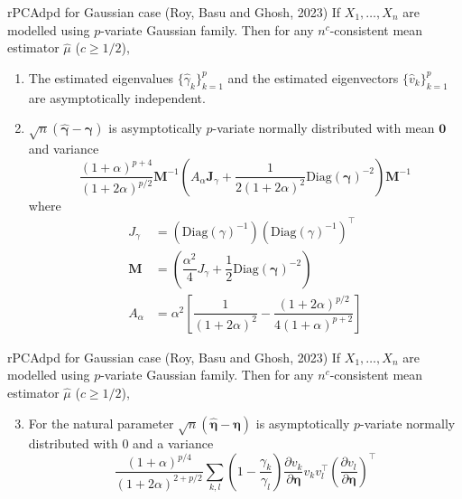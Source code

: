 \documentclass[10pt]{beamer}
\newcommand{\bb}[1]{\boldsymbol{#1}}
\newcommand{\tr}{^{\intercal}}
\begin{document}
\begin{frame}{rPCAdpd for Gaussian case (Roy, Basu and Ghosh, 2023)}
    If $X_1, \dots, X_n$ are modelled using $p$-variate Gaussian family. Then for any $n^c$-consistent mean estimator $\widehat{\mu}$ ($c \geq 1/2$),
    \begin{enumerate}
        \item The estimated eigenvalues $\{ \widehat{\gamma}_k \}_{k=1}^p$ and the estimated eigenvectors $\{ \widehat{v}_k \}_{k=1}^p$ are asymptotically independent.
        \item $\sqrt{n}(\widehat{\bb{\gamma}} - \bb{\gamma})$ is asymptotically $p$-variate normally distributed with mean $\bb{0}$ and variance 
        \begin{equation*}
            \dfrac{(1+\alpha)^{p+4}}{(1+2\alpha)^{p/2}} \bb{M}^{-1} \left( A_\alpha \bb{J}_\gamma + \dfrac{1}{2(1+2\alpha)^2}\text{Diag}(\bb{\gamma})^{-2}  \right)\bb{M}^{-1}
        \end{equation*}
        \noindent where
        \begin{align*}
            J_\gamma & = (\text{Diag}(\gamma)^{-1})(\text{Diag}(\gamma)^{-1})\tr \\
            \bb{M} & = \left( \dfrac{\alpha^2}{4}J_\gamma + \dfrac{1}{2}\text{Diag}(\bb{\gamma})^{-2}  \right)\\
            A_\alpha & = \alpha^2 \left[ \dfrac{1}{(1+2\alpha)^2} - \dfrac{(1+2\alpha)^{p/2}}{4(1+\alpha)^{p+2}} \right]
        \end{align*}
    \end{enumerate}
\end{frame}

\begin{frame}{rPCAdpd for Gaussian case (Roy, Basu and Ghosh, 2023)}
    If $X_1, \dots, X_n$ are modelled using $p$-variate Gaussian family. Then for any $n^c$-consistent mean estimator $\widehat{\mu}$ ($c \geq 1/2$),
    \begin{enumerate}
        \setcounter{enumi}{2}
        \item For the natural parameter $\sqrt{n}(\widehat{\bb{\eta}} - \bb{\eta})$ is asymptotically $p$-variate normally distributed with $0$ and a variance 
        \begin{equation*}
            \dfrac{(1+\alpha)^{p/4}}{(1+2\alpha)^{2 + p/2}} \sum_{k,l} \left( 1 - \dfrac{\gamma_k}{\gamma_l} \right) \dfrac{\partial v_k}{\partial \bb{\eta}} v_k v_l\tr \left( \dfrac{\partial v_l}{\partial \bb{\eta}} \right)\tr
        \end{equation*}
    \end{enumerate}
\end{frame}
\end{document}
